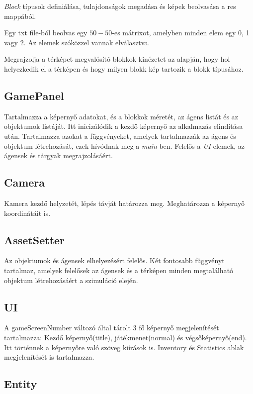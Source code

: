 \textit{Block} típusok definiálása, tulajdonságok megadása és képek beolvasása a res mappából.

Egy txt file-ból beolvas egy $50 - 50$-es mátrixot, amelyben minden elem egy 0, 1 vagy 2. Az elemek szóközzel vannak elválasztva.

Megrajzolja a térképet megvalósító blokkok kinézetet az alapján, hogy hol helyezkedik el a térképen és hogy milyen blokk kép tartozik a blokk típusához.

\subsection{GamePanel}

Tartalmazza a képernyő adatokat, és a blokkok méretét, az ágens listát és az objektumok listáját.
Itt inicizálódik a kezdő képernyő az alkalmazás elindítása után.
Tartalmazza azokat a függvényeket, amelyek tartalmazzák az ágens és objektum létrehozását, ezek hívódnak meg a \textit{main}-ben.
Felelős a \textit{UI} elemek, az ágensek és tárgyak megrajzolásáért.

\subsection{Camera}

Kamera kezdő helyzetét, lépés távját határozza meg.
Meghatározza a képernyő koordinátáit is.

\subsection{AssetSetter}

Az objektumok és ágensek elhelyezésért felelős.
Két fontosabb függvényt tartalmaz, amelyek felelősek az ágensek és a térképen minden megtalálható objektum létrehozásáért a szimuláció elején.

\subsection{UI}

A gameScreenNumber változó által tárolt 3 fő képernyő megjelenítését tartalmazza: Kezdő képernyő(title),
játékmenet(normal) és végsőképernyő(end).
Itt történnek a képernyőre való szöveg kiírások is.
Inventory és Statistics ablak megjelenítését is tartalmazza.

\subsection{Entity}

